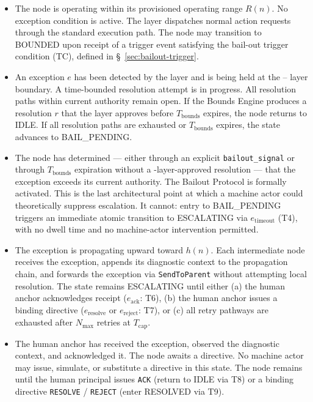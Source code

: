 \begin{itemize}\itemsep=0pt
\item[\textbf{IDLE.}] The node is operating within its provisioned operating range $R(n)$. No exception condition is active. The \fact{} layer dispatches normal action requests through the standard execution path. The node may transition to BOUNDED upon receipt of a trigger event satisfying the bail-out trigger condition (TC), defined in \S~\ref{sec:bailout-trigger}.

\item[\textbf{BOUNDED.}] An exception $e$ has been detected by the \bounds{} layer and is being held at the \bounds{}--\fact{} layer boundary. A time-bounded resolution attempt is in progress. All resolution paths within current authority remain open. If the Bounds Engine produces a resolution $r$ that the \fact{} layer approves before $T_{\text{bounds}}$ expires, the node returns to IDLE. If all resolution paths are exhausted or $T_{\text{bounds}}$ expires, the state advances to BAIL\_PENDING.

\item[\textbf{BAIL\_PENDING.}] The node has determined — either through an explicit \texttt{bailout\_signal} or through $T_{\text{bounds}}$ expiration without a \fact-layer-approved resolution — that the exception exceeds its current authority. The Bailout Protocol is formally activated. This is the last architectural point at which a machine actor could theoretically suppress escalation. It cannot: entry to BAIL\_PENDING triggers an immediate atomic transition to ESCALATING via $e_{\text{timeout}}$ (T4), with no dwell time and no machine-actor intervention permitted.

\item[\textbf{ESCALATING.}] The exception is propagating upward toward $h(n)$. Each intermediate node receives the exception, appends its diagnostic context to the propagation chain, and forwards the exception via \texttt{SendToParent} without attempting local resolution. The state remains ESCALATING until either (a) the human anchor acknowledges receipt ($e_{\text{ack}}$: T6), (b) the human anchor issues a binding directive ($e_{\text{resolve}}$ or $e_{\text{reject}}$: T7), or (c) all retry pathways are exhausted after $N_{\max}$ retries at $T_{\text{cap}}$.

\item[\textbf{HUMAN\_ACKNOWLEDGED.}] The human anchor has received the exception, observed the diagnostic context, and acknowledged it. The node awaits a directive. No machine actor may issue, simulate, or substitute a directive in this state. The node remains until the human principal issues \texttt{ACK} (return to IDLE via T8) or a binding directive \texttt{RESOLVE} / \texttt{REJECT} (enter RESOLVED via T9).


\end{itemize}
